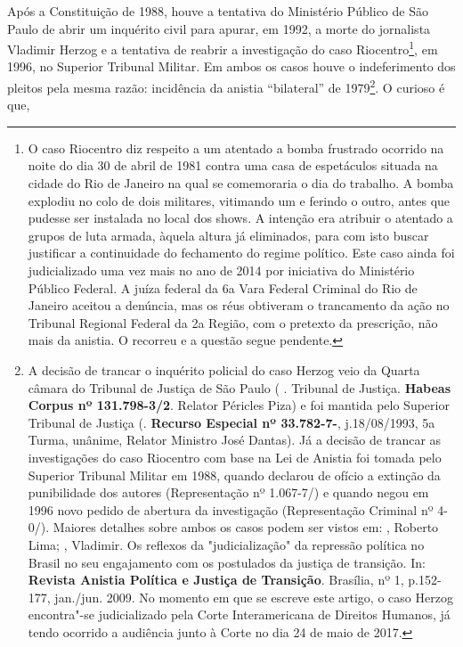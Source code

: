 Após a Constituição de 1988, houve a tentativa do Ministério Público de
São Paulo de abrir um inquérito civil para apurar, em 1992, a morte do
jornalista Vladimir Herzog e a tentativa de reabrir a investigação do
caso Riocentro\footnote{O caso Riocentro diz respeito a um atentado a
  bomba frustrado ocorrido na noite do dia 30 de abril de 1981 contra
  uma casa de espetáculos situada na cidade do Rio de Janeiro na qual se
  comemoraria o dia do trabalho. A bomba explodiu no colo de dois
  militares, vitimando um e ferindo o outro, antes que pudesse ser
  instalada no local dos shows. A intenção era atribuir o atentado a
  grupos de luta armada, àquela altura já eliminados, para com isto
  buscar justificar a continuidade do fechamento do regime político.
  Este caso ainda foi judicializado uma vez mais no ano de 2014 por
  iniciativa do Ministério Público Federal. A juíza federal da 6a Vara
  Federal Criminal do Rio de Janeiro aceitou a denúncia, mas os réus
  obtiveram o trancamento da ação no Tribunal Regional Federal da 2a
  Região, com o pretexto da prescrição, não mais da anistia. O 
  recorreu e a questão segue pendente.}, em 1996, no Superior Tribunal
Militar. Em ambos os casos houve o indeferimento dos pleitos pela mesma
razão: incidência da anistia ``bilateral'' de 1979\footnote{A decisão de
  trancar o inquérito policial do caso Herzog veio da Quarta câmara do
  Tribunal de Justiça de São Paulo ( . Tribunal de Justiça.
  \textbf{Habeas Corpus nº 131.798-3/2}. Relator Péricles Piza) e foi
  mantida pelo Superior Tribunal de Justiça (. \textbf{Recurso Especial nº 33.782-7-}, j.18/08/1993, 5a
  Turma, unânime, Relator Ministro José Dantas). Já a decisão de trancar
  as investigações do caso Riocentro com base na Lei de Anistia foi
  tomada pelo Superior Tribunal Militar em 1988, quando declarou de
  ofício a extinção da punibilidade dos autores (Representação nº
  1.067-7/) e quando negou em 1996 novo pedido de abertura da
  investigação (Representação Criminal nº 4-0/). Maiores detalhes
  sobre ambos os casos podem ser vistos em: , Roberto Lima; 
  , Vladimir. Os reflexos da "judicialização" da repressão política
  no Brasil no seu engajamento com os postulados da justiça de
  transição. In: \textbf{Revista Anistia Política e Justiça de
  Transição}. Brasília, nº 1, p.152-177, jan./jun. 2009. No momento em
  que se escreve este artigo, o caso Herzog encontra"-se judicializado
  pela Corte Interamericana de Direitos Humanos, já tendo ocorrido a
  audiência junto à Corte no dia 24 de maio de 2017.}. O curioso é que,
